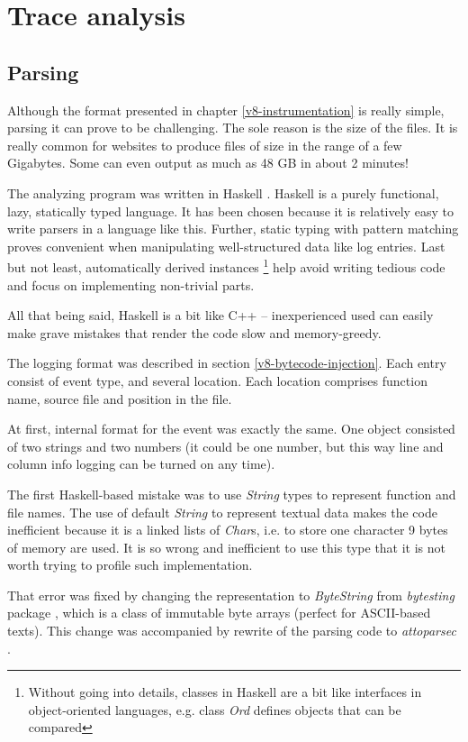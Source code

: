 \chapter{Trace analysis}

\section{Parsing}
Although the format presented in chapter \ref{v8-instrumentation} is really simple, parsing it can prove to be challenging.
The sole reason is the size of the files. It is really common for websites to produce files of size in the range of a few Gigabytes.
Some can even output as much as 48 GB in about 2 minutes!

The analyzing program was written in Haskell \cite{haskell:main-page}.
Haskell is a purely functional, lazy, statically typed language.
It has been chosen because it is relatively easy to write parsers in a language like this.
Further, static typing with pattern matching proves convenient when manipulating well-structured data like log entries.
Last but not least, automatically derived instances
\footnote{Without going into details, classes in Haskell are a bit like interfaces in 
object-oriented languages, e.g. class \emph{Ord} defines objects that can be compared}
help avoid writing tedious code and focus on implementing non-trivial parts.

All that being said, Haskell is a bit like C++ -- inexperienced used can easily make grave mistakes
that render the code slow and memory-greedy.

The logging format was described in section \ref{v8-bytecode-injection}.
Each entry consist of event type, and several location. Each location comprises
function name, source file and position in the file.

At first, internal format for the event was exactly the same. One object consisted of
two strings and two numbers (it could be one number, but this way line and column info
logging can be turned on any time).

The first Haskell-based mistake was to use \emph{String} types to represent function and file
names. The use of default \emph{String} to represent textual data makes the code inefficient 
because it is a linked lists of \emph{Char}s, i.e. to store one character 9 bytes of memory are used.
It is so wrong and inefficient to use this type that it is not worth trying to profile such implementation.

That error was fixed by changing the representation to \emph{ByteString} from \emph{bytesting} 
package \cite{haskell:bytestring}, which 
is a class of immutable byte arrays (perfect for ASCII-based texts). 
This change was accompanied by rewrite of the parsing code to \emph{attoparsec} \cite{haskell:attoparsec}.

